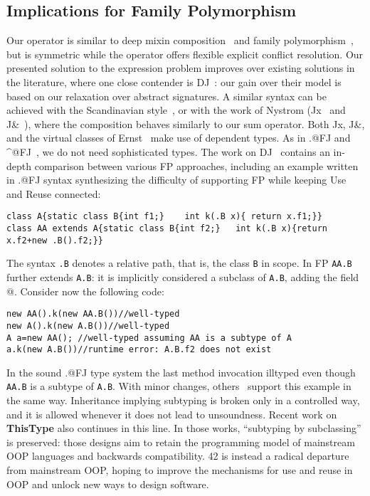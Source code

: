 \subsection{Implications for Family
Polymorphism}
\saveSpace
Our \Q@Use@ operator is similar to deep mixin
composition~\cite{ernst99a,Zenger-Odersky2005, Hutchins06}
and family polymorphism~\cite{Ernst06, igarashi2005lightweight,
IgarashiViroli07, IgarashiEtAl08}, but is symmetric while the operator
\Q@super@ offers flexible  explicit conflict resolution.
Our presented solution to the expression problem improves over existing solutions in the literature, where one close contender is DJ~\cite{deep}: our gain over their model is based on our relaxation over abstract signatures.
A similar syntax can be achieved with the Scandinavian style~\cite{ernst2004expression}, or with the work of 
Nystrom (Jx~\cite{NystromEtAl04} and
J\&~\cite{nystrom2006j}), where the composition behaves similarly to our sum operator.
Both Jx, J\&, and the virtual classes of Ernst~\cite{Ernst06}
make use of dependent types.
As in \Q@.@FJ and \Q@^@FJ~\cite{igarashi2005lightweight,IgarashiEtAl08,IgarashiViroli07,saito2008essence},
 we do not need sophisticated types. 
The work on DJ~\cite{deep} contains an in-depth comparison between various FP approaches, including an example written in \Q@.@FJ syntax synthesizing the difficulty of supporting FP while keeping Use and Reuse connected:
\saveSpace\saveSpace
\begin{lstlisting}
class A{static class B{int f1;}    int k(.B x){ return x.f1;}}
class AA extends A{static class B{int f2;}   int k(.B x){return x.f2+new .B().f2;}}
\end{lstlisting}\saveSpace\saveSpace
The syntax \lstinline{.B} denotes a relative path, that is, the 
class \lstinline{B} in scope.
In FP \lstinline{AA.B} further extends \lstinline{A.B}: it is implicitly considered a subclass of \lstinline{A.B}, adding the field @.
Consider now the following code:
\saveSpace\saveSpace\begin{lstlisting}
new AA().k(new AA.B())//well-typed
new A().k(new A.B())//well-typed
A a=new AA(); //well-typed assuming AA is a subtype of A
a.k(new A.B())//runtime error: A.B.f2 does not exist
\end{lstlisting}\saveSpace\saveSpace
In the sound \Q@.@FJ type system the last method invocation illtyped even though \lstinline{AA.B} is a subtype of \lstinline{A.B}.
With minor changes, others~\cite{nystrom2006j,Ernst06,BruceEtAl98,IgarashiViroli07}
support this example in the same way.
Inheritance implying subtyping is broken only in a controlled way, and it is allowed whenever it does not lead to unsoundness.
Recent work on {\bf ThisType} \cite{Saito:2009,ryu16ThisType}
also continues in this line.
In those works, ``subtyping by subclassing'' is preserved: those designs aim to retain the programming model of mainstream OOP languages and backwards compatibility. 42 is instead a radical departure from mainstream OOP, hoping to improve the mechanisms for use and reuse in OOP and unlock new ways to design software.

